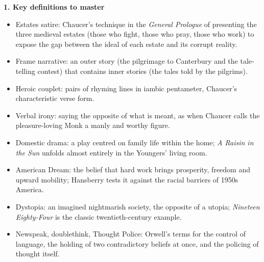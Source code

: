 \documentclass[11pt]{article}
\newcommand{\cle}[1]{{\popxbold\color{popdark}#1}}
\begin{document}
\begin{bilan}
\textbf{1. Key definitions to master}
\begin{itemize}
  \item \cle{Estates satire}: Chaucer's technique in the \emph{General Prologue} of presenting the three medieval estates (those who fight, those who pray, those who work) to expose the gap between the ideal of each estate and its corrupt reality.
  \item \cle{Frame narrative}: an outer story (the pilgrimage to Canterbury and the tale-telling contest) that contains inner stories (the tales told by the pilgrims).
  \item \cle{Heroic couplet}: pairs of rhyming lines in iambic pentameter, Chaucer's characteristic verse form.
  \item \cle{Verbal irony}: saying the opposite of what is meant, as when Chaucer calls the pleasure-loving Monk a manly and worthy figure.
  \item \cle{Domestic drama}: a play centred on family life within the home; \emph{A Raisin in the Sun} unfolds almost entirely in the Youngers' living room.
  \item \cle{American Dream}: the belief that hard work brings prosperity, freedom and upward mobility; Hansberry tests it against the racial barriers of 1950s America.
  \item \cle{Dystopia}: an imagined nightmarish society, the opposite of a utopia; \emph{Nineteen Eighty-Four} is the classic twentieth-century example.
  \item \cle{Newspeak}, \cle{doublethink}, \cle{Thought Police}: Orwell's terms for the control of language, the holding of two contradictory beliefs at once, and the policing of thought itself.
\end{itemize}


\end{bilan}
\end{document}

